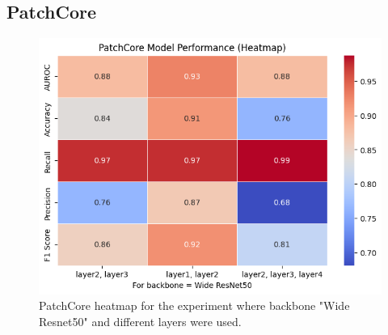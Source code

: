 



\subsection*{PatchCore}

\begin{figure}[H]
    \centering
    \includegraphics[width=1\linewidth]{Rohit_Master_Thesis//Images/patchcore heatmap.png}
    \caption{PatchCore heatmap for the experiment where backbone "Wide Resnet50" and different layers were used.}
    \label{fig:patchcore heatmap}
\end{figure}


